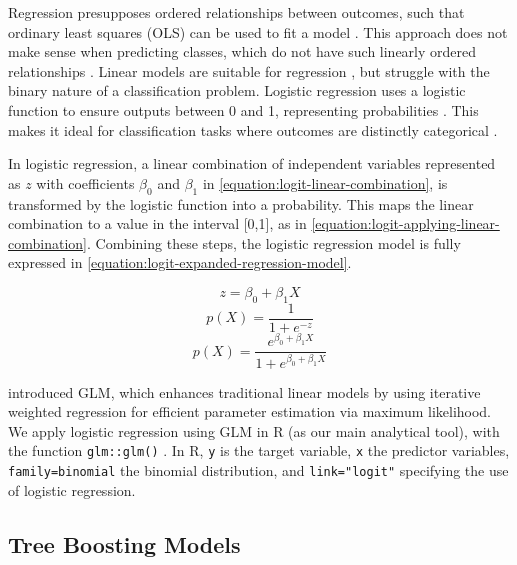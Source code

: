 Regression presupposes ordered relationships between outcomes, such that ordinary least squares (OLS) can be used to fit a model \parencite{ban404-the-elements-of-statistical-learning}. This approach does not make sense when predicting classes, which do not have such linearly ordered relationships \parencite{ban404-the-elements-of-statistical-learning}. Linear models are suitable for regression \parencite{pearson-linear-regression}, but struggle with the binary nature of a classification problem. Logistic regression uses a logistic function to ensure outputs between 0 and 1, representing probabilities \parencite{berkson-logistic-regression}. This makes it ideal for classification tasks where outcomes are distinctly categorical \parencite{berkson-logistic-regression}. 

In logistic regression, a linear combination of independent variables represented as $z$ with coefficients $\beta_0$ and $\beta_1$ in \autoref{equation:logit-linear-combination}, is transformed by the logistic function into a probability. This maps the linear combination to a value in the interval [0,1], as in \autoref{equation:logit-applying-linear-combination}. Combining these steps, the logistic regression model is fully expressed in \autoref{equation:logit-expanded-regression-model}. 

\begin{equation}
\label{equation:logit-linear-combination}
    z = \beta_0 + \beta_1X
\end{equation}
\begin{equation} 
\label{equation:logit-applying-linear-combination}
    p(X) = \frac{1}{1 + e^{-z}}
\end{equation}
\begin{equation} 
\label{equation:logit-expanded-regression-model}
    p(X) = \frac{e^{\beta_0 + \beta_1X}}{1 + e^{\beta_0 + \beta_1X}}
\end{equation}

\textcite{glm-generalized-linear-models} introduced GLM, which enhances traditional linear models by using iterative weighted regression for efficient parameter estimation via maximum likelihood. We apply logistic regression using GLM in R (as our main analytical tool), with the function \texttt{glm::glm()} \parencite{glm-r-documentation}. In R, \texttt{y} is the target variable, \texttt{x} the predictor variables, \texttt{family=binomial} the binomial distribution, and \texttt{link="logit"} specifying the use of logistic regression.

\subsection{Tree Boosting Models}

